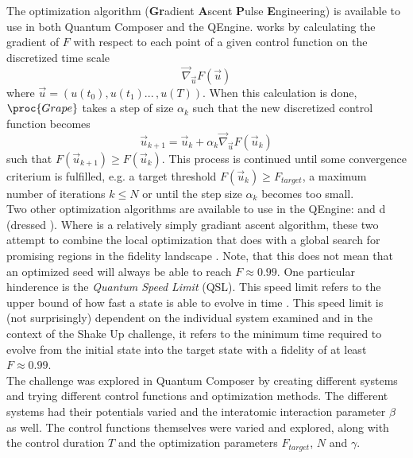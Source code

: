 \documentclass[a4paper, twocolumn]{revtex4-1}
\begin{document}
The optimization algorithm  (\textbf{Gr}adient \textbf Ascent \textbf Pulse \textbf Engineering) is available to use in both Quantum Composer and the QEngine.  works by calculating the gradient of $F$ with respect to each point of a given control function on the discretized time scale 
\begin{equation}
	\vec{\nabla}_{\vec{u}}F(\vec{u})
\end{equation}
where $\vec{u} = (u(t_0), u(t_1) ... \,, u(T))$. When this calculation is done, $\proc{Grape}$ takes a step of size $\alpha_k$ such that the new discretized control function becomes
\begin{equation}
	\vec{u}_{k+1} = \vec{u}_{k} + \alpha_k \vec{\nabla}_{\vec{u}}F(\vec{u}_k)
\end{equation}
such that $F(\vec{u}_{k+1}) \geq F(\vec{u}_{k})$. This process is continued until some convergence criterium is fulfilled, e.g. a target threshold $F(\vec{u}_{k}) \geq F_{target}$, a maximum number of iterations $k \leq N$ or until the step size $\alpha_k$ becomes too small. \\

Two other optimization algorithms are available to use in the QEngine:  and d (dressed ). Where  is a relatively simply gradiant ascent algorithm, these two attempt to combine the local optimization that  does with a global search for promising regions in the fidelity landscape \cite{GroupPaper, QEngine}. 
Note, that this does not mean that an optimized seed will always be able to reach $F\approx0.99$. One particular hinderence is the \textit{Quantum Speed Limit} (QSL). This speed limit refers to the upper bound of how fast a state is able to evolve in time \cite{Deffner_2017}. This speed limit is (not surprisingly) dependent on the individual system examined and in the context of the Shake Up challenge, it refers to the minimum time required to evolve from the initial state into the target state with a fidelity of at least $F\approx 0.99$. \\

The challenge was explored in Quantum Composer by creating different systems and trying different control functions and optimization methods. The different systems had their potentials varied and the interatomic interaction parameter $\beta$ as well. The control functions themselves were varied and explored, along with the control duration $T$ and the  optimization parameters $F_{target}$, $N$ and $\gamma$.
\end{document}
